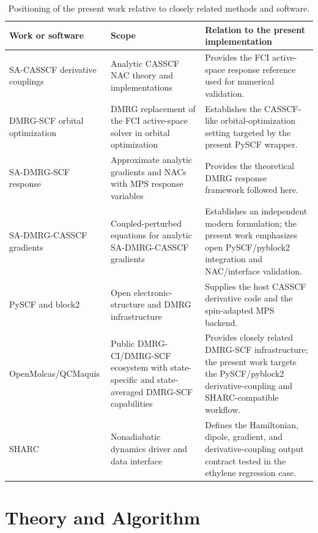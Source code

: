 \documentclass[journal=jctcce,manuscript=article]{achemso}
\begin{document}
\begin{table}[t]
\centering
\small
\caption{Positioning of the present work relative to closely related methods
and software.}
\label{tab:positioning}
\begin{tabular}{p{}p{}p{}}
\toprule
Work or software & Scope & Relation to the present implementation \\
\midrule
SA-CASSCF derivative couplings\cite{FdezGalvan2016}
& Analytic CASSCF NAC theory and implementations
& Provides the FCI active-space response reference used for numerical
validation. \\
DMRG-SCF orbital optimization\cite{ZgidNooijen2008,Ghosh2008}
& DMRG replacement of the FCI active-space solver in orbital optimization
& Establishes the CASSCF-like orbital-optimization setting targeted by the
present PySCF wrapper. \\
SA-DMRG-SCF response\cite{Freitag2019}
& Approximate analytic gradients and NACs with MPS response variables
& Provides the theoretical DMRG response framework followed here. \\
SA-DMRG-CASSCF gradients\cite{Iino2023}
& Coupled-perturbed equations for analytic SA-DMRG-CASSCF gradients
& Establishes an independent modern formulation; the present work emphasizes
open PySCF/pyblock2 integration and NAC/interface validation. \\
PySCF and block2\cite{Sun2018PySCF,Sun2020PySCF,Zhai2023Block2}
& Open electronic-structure and DMRG infrastructure
& Supplies the host CASSCF derivative code and the spin-adapted MPS backend. \\
OpenMolcas/QCMaquis
& Public DMRG-CI/DMRG-SCF ecosystem with state-specific and state-averaged
DMRG-SCF capabilities\cite{Aquilante2020OpenMolcas,Szenes2025QCMaquis}
& Provides closely related DMRG-SCF infrastructure; the present work targets
the PySCF/pyblock2 derivative-coupling and SHARC-compatible workflow. \\
SHARC\cite{Richter2011SHARC,Mai2018SHARC}
& Nonadiabatic dynamics driver and data interface
& Defines the Hamiltonian, dipole, gradient, and derivative-coupling output
contract tested in the ethylene regression case. \\
\bottomrule
\end{tabular}
\end{table}

\section{Theory and Algorithm}
\end{document}
